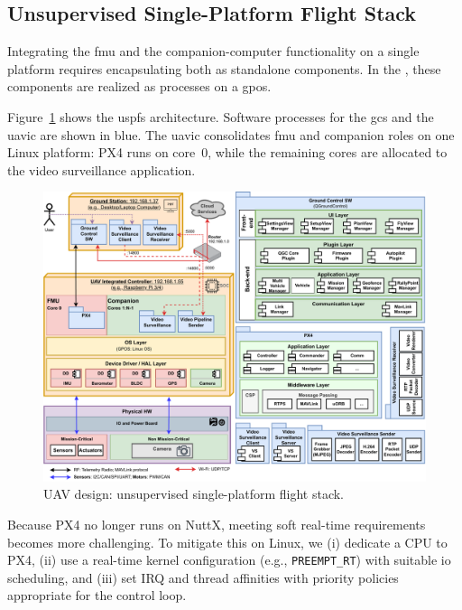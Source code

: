 \subsection{Unsupervised Single-Platform Flight Stack}
\label{sec:unsuperv-stack}

Integrating the \gls{fmu} and the companion-computer functionality on a single
platform requires encapsulating both as standalone components. In the
, these components are realized as processes on a \gls{gpos}.

Figure~\ref{fig:uav-design-unsup} shows the \gls{uspfs} architecture. Software
processes for the \gls{gcs} and the \gls{uavic} are shown in blue. The
\gls{uavic} consolidates \gls{fmu} and companion roles on one Linux platform:
PX4 runs on core~0, while the remaining cores are allocated to the video
surveillance application.

\begin{figure}[!hbt]
  \centering
  \includegraphics[width=1.0\textwidth]{./img/pdf/uav-main-design-unsup.pdf}
  \caption{UAV design: unsupervised single-platform flight stack.}
  \label{fig:uav-design-unsup}
\end{figure}

Because PX4 no longer runs on NuttX, meeting soft real-time requirements becomes
more challenging. To mitigate this on Linux, we (i) dedicate a CPU to PX4, (ii)
use a real-time kernel configuration (e.g., \texttt{PREEMPT\_RT}) with suitable
\gls{io} scheduling, and (iii) set IRQ and thread affinities with
priority policies appropriate for the control loop.

